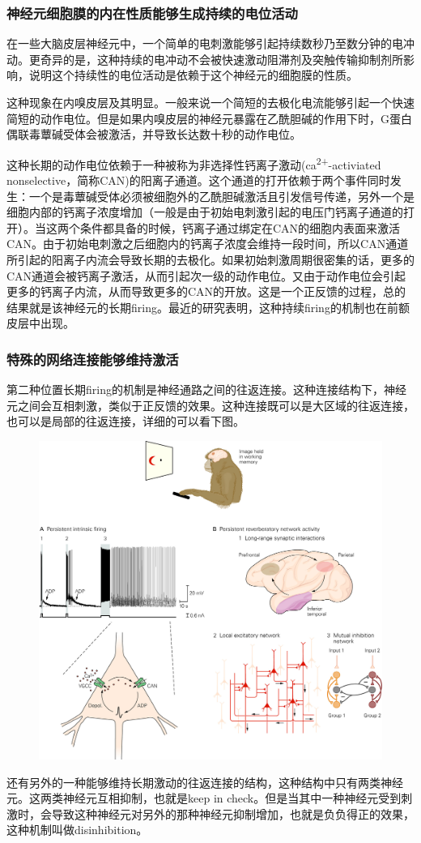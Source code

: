\documentclass[UTF8,nofonts]{ctexart}
\begin{document}
\subsubsection{神经元细胞膜的内在性质能够生成持续的电位活动}
在一些大脑皮层神经元中，一个简单的电刺激能够引起持续数秒乃至数分钟的电冲动。更奇异的是，这种持续的电冲动不会被快速激动阻滞剂及突触传输抑制剂所影响，说明这个持续性的电位活动是依赖于这个神经元的细胞膜的性质。
\par
这种现象在内嗅皮层及其明显。一般来说一个简短的去极化电流能够引起一个快速简短的动作电位。但是如果内嗅皮层的神经元暴露在乙酰胆碱的作用下时，G蛋白偶联毒蕈碱受体会被激活，并导致长达数十秒的动作电位。
\par
这种长期的动作电位依赖于一种被称为非选择性钙离子激动(ca\textsuperscript{2+}-activiated nonselective，简称CAN)的阳离子通道。这个通道的打开依赖于两个事件同时发生：一个是毒蕈碱受体必须被细胞外的乙酰胆碱激活且引发信号传递，另外一个是细胞内部的钙离子浓度增加（一般是由于初始电刺激引起的电压门钙离子通道的打开）。当这两个条件都具备的时候，钙离子通过绑定在CAN的细胞内表面来激活CAN。由于初始电刺激之后细胞内的钙离子浓度会维持一段时间，所以CAN通道所引起的阳离子内流会导致长期的去极化。如果初始刺激周期很密集的话，更多的CAN通道会被钙离子激活，从而引起次一级的动作电位。又由于动作电位会引起更多的钙离子内流，从而导致更多的CAN的开放。这是一个正反馈的过程，总的结果就是该神经元的长期firing。最近的研究表明，这种持续firing的机制也在前额皮层中出现。
\subsubsection{特殊的网络连接能够维持激活}
第二种位置长期firing的机制是神经通路之间的往返连接。这种连接结构下，神经元之间会互相刺激，类似于正反馈的效果。这种连接既可以是大区域的往返连接，也可以是局部的往返连接，详细的可以看下图。
\begin{figure}[h]
	\centering
	\includegraphics[scale=0.9]{Pic/6701_PNS5.jpg}
\end{figure}
还有另外的一种能够维持长期激动的往返连接的结构，这种结构中只有两类神经元。这两类神经元互相抑制，也就是keep in check。但是当其中一种神经元受到刺激时，会导致这种神经元对另外的那种神经元抑制增加，也就是负负得正的效果，这种机制叫做disinhibition。
\end{document}
